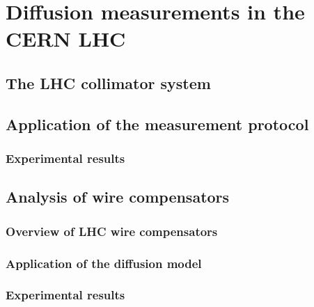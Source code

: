 \chapter{Diffusion measurements in the CERN LHC}

\section{The LHC collimator system}

\section{Application of the measurement protocol}

\subsection{Experimental results}

\section{Analysis of wire compensators}

\subsection{Overview of LHC wire compensators}

\subsection{Application of the diffusion model}

\subsection{Experimental results}